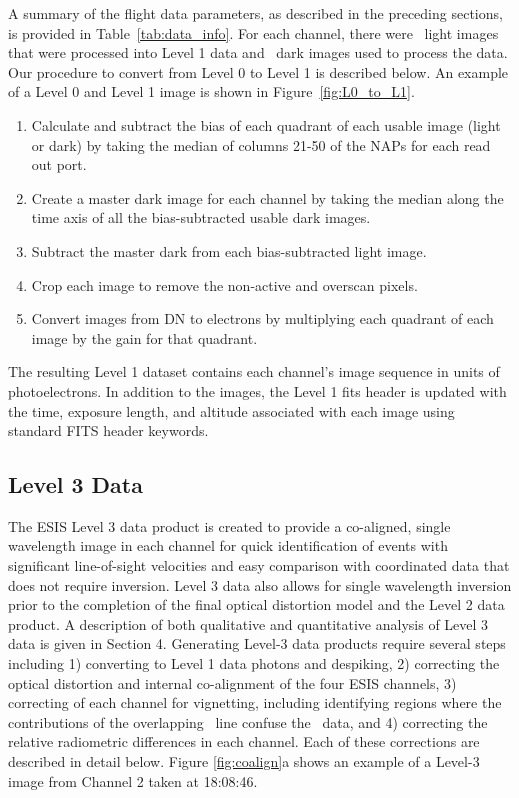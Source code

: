 A summary of the flight data parameters, as described in the preceding sections, is provided in Table~\ref{tab:data_info}. 
For each channel, there were \numDataFrames\ light images that were processed into Level 1 data and \numDarkFrames\ dark images used to process the data.
Our procedure to convert from Level 0 to Level 1 is described below. An example of a Level 0 and Level 1 image is shown in Figure~\ref{fig:L0_to_L1}.

\begin{enumerate}
    \item Calculate and subtract the bias of each quadrant of each usable image (light or dark) by taking the median of columns 21-50 of the NAPs for each read out port.   
    \item Create a master dark image for each channel by taking the median along the time axis of all the bias-subtracted usable dark images.
    \item Subtract the master dark from each bias-subtracted light image.
    \item Crop each image to remove the non-active and overscan pixels.
    \item Convert images from DN to electrons by multiplying each quadrant of each image by the gain for that quadrant.
\end{enumerate}
The resulting Level 1 dataset contains each channel's image sequence in units of photoelectrons.
In addition to the images, the Level 1 fits header is updated with the time, exposure length, and altitude associated with each image using standard FITS header keywords.   
	

\subsection{Level 3 Data} \label{sec:level-3}
 
    
\newcommand{\vigfit}{[.35, 0.28, 0.34, 0.6]}
\newcommand{\levthreetime}{18:08:46}

The ESIS Level 3 data product is created to provide a co-aligned, single wavelength image in each channel for quick identification of events with significant line-of-sight velocities and easy comparison with coordinated data that does not require inversion. 
Level 3 data also allows for single wavelength inversion prior to the completion of the final optical distortion model and the Level 2 data product.  A description of both qualitative and quantitative analysis of Level 3 data is given in Section 4.  Generating Level-3 data products require several steps including 1) converting to  Level 1 data photons and despiking, 2) correcting the optical distortion and internal co-alignment of the four ESIS channels, 3) correcting of each channel for vignetting, including identifying regions where the contributions of the overlapping \mgxbright \ line confuse the \ov \ data, and 4) correcting the relative radiometric differences in each channel.  Each of these corrections are described in detail below. 
Figure \ref{fig:coalign}a shows an example of a Level-3 image from Channel 2 taken at \levthreetime.

